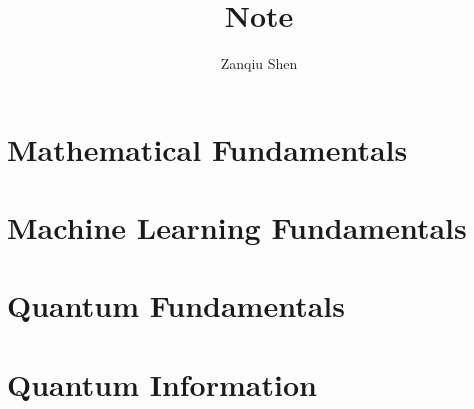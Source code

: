 \documentclass[a4paper,11pt,openany]{book}
\begin{document}
\title{\textbf{Note}}
\author{Zanqiu Shen}
\maketitle
%
\tableofcontents

\setcounter{chapter}{0}
\part{Mathematical Fundamentals}




\part{Machine Learning Fundamentals}


\part{Quantum Fundamentals}




\part{Quantum Information}



\end{document}
